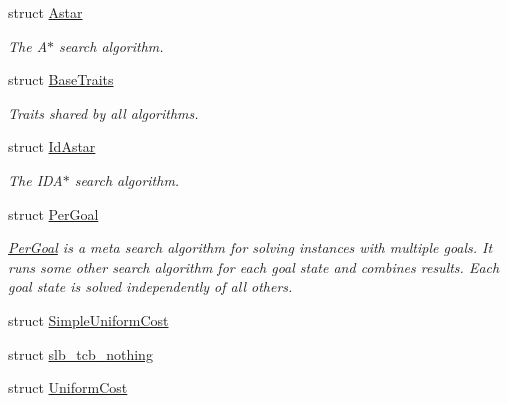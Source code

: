 \begin{DoxyCompactItemize}
struct \hyperlink{structslb_1_1ext_1_1algorithm_1_1Astar}{Astar}
\begin{DoxyCompactList}\small\item\em The {\ttfamily A$\ast$} search algorithm. \end{DoxyCompactList}\item 
struct \hyperlink{structslb_1_1ext_1_1algorithm_1_1BaseTraits}{Base\+Traits}
\begin{DoxyCompactList}\small\item\em Traits shared by all algorithms. \end{DoxyCompactList}\item 
struct \hyperlink{structslb_1_1ext_1_1algorithm_1_1IdAstar}{Id\+Astar}
\begin{DoxyCompactList}\small\item\em The {\ttfamily I\+D\+A$\ast$} search algorithm. \end{DoxyCompactList}\item 
struct \hyperlink{structslb_1_1ext_1_1algorithm_1_1PerGoal}{Per\+Goal}
\begin{DoxyCompactList}\small\item\em {\ttfamily \hyperlink{structslb_1_1ext_1_1algorithm_1_1PerGoal}{Per\+Goal}} is a meta search algorithm for solving instances with multiple goals. It runs some other search algorithm for each goal state and combines results. Each goal state is solved independently of all others. \end{DoxyCompactList}\item 
struct \hyperlink{structslb_1_1ext_1_1algorithm_1_1SimpleUniformCost}{Simple\+Uniform\+Cost}
\item 
struct \hyperlink{structslb_1_1ext_1_1algorithm_1_1slb__tcb__nothing}{slb\+\_\+tcb\+\_\+nothing}
\item 
struct \hyperlink{structslb_1_1ext_1_1algorithm_1_1UniformCost}{Uniform\+Cost}
\end{DoxyCompactItemize}
